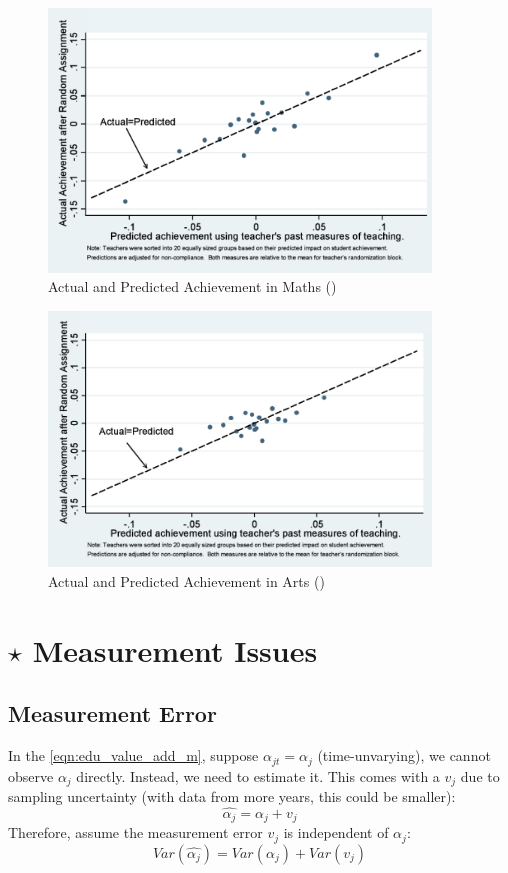         \begin{figure}[H]
            \centering
            \includegraphics[width=4in]{images/ch9/9 kane math.png}
            \caption{Actual and Predicted Achievement in Maths (\cite{kane_have_2013})}
        \end{figure}
        \begin{figure}[H]
            \centering
            \includegraphics[width=4in]{images/ch9/9 kane arts.png}
            \caption{Actual and Predicted Achievement in Arts (\cite{kane_have_2013})}
        \end{figure}
        
\section{$\star$ Measurement Issues}

    \subsection{Measurement Error}

        In the \ref{eqn:edu_value_add_m}, suppose $\alpha_{jt}=\alpha_{j}$ (time-unvarying), we cannot observe $\alpha_j$ directly. Instead, we need to estimate it. This comes with a  $v_j$ due to sampling uncertainty (with data from more years, this could be smaller):
        $$\widehat{\alpha_j}=\alpha_j + v_j$$
        Therefore, assume the measurement error $v_j$ is independent of $\alpha_j$:
        $$Var(\widehat{\alpha_j})=Var(\alpha_j)+Var(v_j)$$
        

